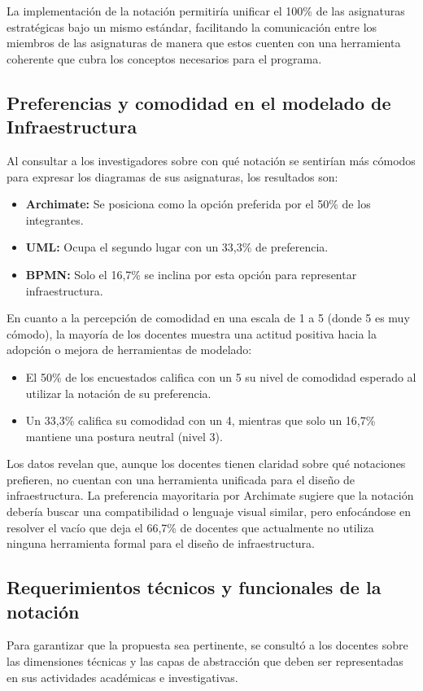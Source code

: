La implementación de la notación permitiría unificar el 100\% de las asignaturas estratégicas bajo un mismo estándar, facilitando la comunicación entre los miembros de las asignaturas de manera que estos cuenten con una herramienta coherente que cubra los conceptos necesarios para el programa. 

\subsection{Preferencias y comodidad en el modelado de Infraestructura}
Al consultar a los investigadores sobre con qué notación se sentirían más cómodos para expresar los diagramas de sus asignaturas, los resultados son:


\begin{itemize}
	\item \textbf{Archimate:} Se posiciona como la opción preferida por el 50\% de los integrantes.
	\item \textbf{UML:} Ocupa el segundo lugar con un 33,3\% de preferencia.
	\item \textbf{BPMN:} Solo el 16,7\% se inclina por esta opción para representar infraestructura.
\end{itemize}

En cuanto a la percepción de comodidad en una escala de 1 a 5 (donde 5 es muy cómodo), la mayoría de los docentes muestra una actitud positiva hacia la adopción o mejora de herramientas de modelado:


\begin{itemize}
	\item El 50\% de los encuestados califica con un 5 su nivel de comodidad esperado al utilizar la notación de su preferencia.
	\item Un 33,3\% califica su comodidad con un 4, mientras que solo un 16,7\% mantiene una postura neutral (nivel 3).
\end{itemize}

Los datos revelan que, aunque los docentes tienen claridad sobre qué notaciones prefieren, no cuentan con una herramienta unificada para el diseño de infraestructura. La preferencia mayoritaria por Archimate sugiere que la notación \NDITI debería buscar una compatibilidad o lenguaje visual similar, pero enfocándose en resolver el vacío que deja el 66,7\% de docentes que actualmente no utiliza ninguna herramienta formal para el diseño de infraestructura.

\subsection{Requerimientos técnicos y funcionales de la notación}
Para garantizar que la propuesta \NDITI sea pertinente, se consultó a los docentes sobre las dimensiones técnicas y las capas de abstracción que deben ser representadas en sus actividades académicas e investigativas.

